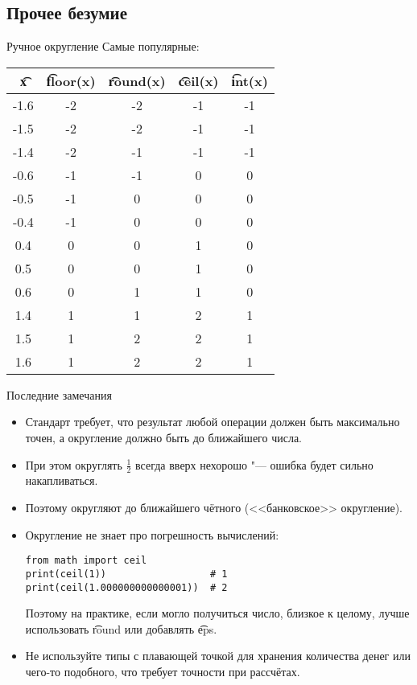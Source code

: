 \subsection{Прочее безумие}

\begin{frame}
\end{frame}

\begin{frame}{Ручное округление}
	Самые популярные:
	\begin{center}
		\begin{tabular}{|c|c|c|c|c|}
			\hline
			\t{x} & \t{floor(x)} & \t{round(x)} & \t{ceil(x)} & \t{int(x) } \\\hline
			-1.6 & -2 & -2 & -1 & -1 \\
			-1.5 & -2 & -2 & -1 & -1 \\
			-1.4 & -2 & -1 & -1 & -1 \\
			-0.6 & -1 & -1 & 0 & 0 \\
			-0.5 & -1 & 0 & 0 & 0 \\
			-0.4 & -1 & 0 & 0 & 0 \\
			0.4 & 0 & 0 & 1 & 0 \\
			0.5 & 0 & 0 & 1 & 0 \\
			0.6 & 0 & 1 & 1 & 0 \\
			1.4 & 1 & 1 & 2 & 1 \\
			1.5 & 1 & 2 & 2 & 1 \\
			1.6 & 1 & 2 & 2 & 1 \\
			\hline
		\end{tabular}
	\end{center}
\end{frame}

\begin{frame}[fragile]{Последние замечания}
	\begin{itemize}
		\item
			Стандарт требует, что результат любой операции должен быть максимально точен, а округление должно быть до ближайшего числа.
		\item
			При этом округлять $\frac{1}{2}$ всегда вверх нехорошо "--- ошибка будет сильно накапливаться.
		\item
			Поэтому округляют до ближайшего чётного (<<банковское>> округление).
		\item
			Округление не знает про погрешность вычислений:
\begin{verbatim}
from math import ceil
print(ceil(1))                  # 1
print(ceil(1.000000000000001))  # 2
\end{verbatim}
	Поэтому на практике, если могло получиться число, близкое к целому, лучше использовать \t{round} или добавлять \t{eps}.
		\item
			Не используйте типы с плавающей точкой для хранения количества денег или чего-то подобного, что требует точности при рассчётах.
	\end{itemize}
\end{frame}
